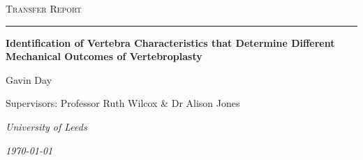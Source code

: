 \begin{titlepage}

\center


\textsc{\Large Transfer Report}\\[0.5cm]
\hrule
\vspace{3cm}

{\LARGE \textbf{Identification of Vertebra Characteristics that Determine Different Mechanical Outcomes of Vertebroplasty}\par}  %

 \vspace{5cm}

Gavin Day

\vspace{0.5cm}

Supervisors: Professor Ruth Wilcox \& Dr Alison Jones


\vspace{7cm}

\textit{University of Leeds}

\textit{\today}
\vfill

\end{titlepage}


\pagebreak